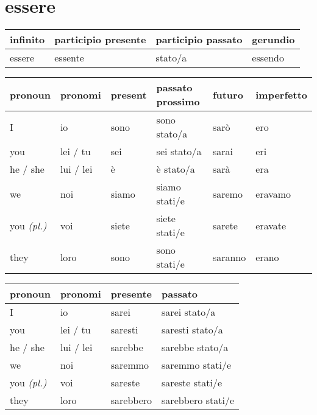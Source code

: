 \documentclass{article} %
\newcommand{\baseverb}{ess}
\begin{document}
    \section*{\baseverb{}ere}
    
    \begin{center}
        \begin{tabular}{llll}
            \textbf{infinito} & \textbf{participio presente} & \textbf{participio passato} & \textbf{gerundio} \\
            \hline
            \baseverb{}ere & \baseverb{}ente & stato/a & \baseverb{}endo \\
        \end{tabular}

        \begin{tabular}{llllll}
            \textbf{pronoun} & \textbf{pronomi} & \textbf{present} & \textbf{passato prossimo} & \textbf{futuro} & \textbf{imperfetto} \\
            \hline
            I                   & io        & sono  & sono stato/a  & sar\`{o} & ero     \\
            you                 & lei / tu  & sei   & sei stato/a   & sarai    & eri     \\
            he / she            & lui / lei & \`{e} & \`{e} stato/a & sar\`{a} & era     \\
            we                  & noi       & siamo & siamo stati/e & saremo   & eravamo \\ 
            you \textit{(pl.)}  & voi       & siete & siete stati/e & sarete   & eravate \\
            they                & loro      & sono  & sono stati/e  & saranno  & erano   \\
        \end{tabular}

        \begin{tabular}{llll}
            \textbf{pronoun} & \textbf{pronomi} & \textbf{presente} & \textbf{passato}\\
            \hline
            I                   & io        & sarei     & sarei stato/a   \\
            you                 & lei / tu  & saresti   & saresti stato/a \\
            he / she            & lui / lei & sarebbe   & sarebbe stato/a \\
            we                  & noi       & saremmo   & saremmo stati/e \\ 
            you \textit{(pl.)}  & voi       & sareste   & sareste stati/e \\
            they                & loro      & sarebbero & sarebbero stati/e\\
        \end{tabular}


\end{center}
\end{document}
